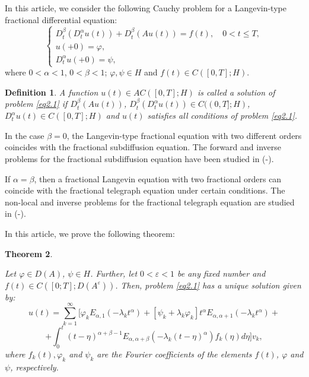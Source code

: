 \documentclass{amsart}
\numberwithin{equation}{section}
\newtheorem{thm}{Theorem}[section]
\newtheorem{defin}[thm]{Definition}
\begin{document}
In this article, we consider the following Cauchy problem for a  Langevin-type  fractional differential equation:
\begin{equation}\label{eq2.1}
 \begin{cases}
    D_{t}^{\beta}(D_t^{\alpha} u(t)) +D_t^{\beta} (A u(t))=f(t), \quad 0<t \leq T,
\\
    u(+0)=\varphi,
\\
D_t^{\alpha} u(+0)=\psi,
\end{cases}
\end{equation}where $0<\alpha<1$, $0<\beta<1$; $\varphi,\psi \in H$ and   $f(t) \in C([0,T];H)$.









\begin{defin}\label{defsol} A function  $u(t)\in AC([0,T];H)$  is called a solution of problem  \eqref{eq2.1} if $D_t^\beta (A u(t))$, $D_t^\beta(D_t^\alpha u(t)) \in C((0,T];H)$, $D_t^\alpha u(t) \in C([0,T];H)$ and $u(t)$ satisfies all conditions of problem \eqref{eq2.1}.
\end{defin}


In the case $\beta=0$, the Langevin-type fractional equation with two different orders coincides with the fractional subdiffusion equation. The forward and inverse problems for the fractional subdiffusion equation have been studied in (\cite{AlimovAshurov}-\cite{AshurovFayziev2}).

If $\alpha=\beta$, then a fractional Langevin equation with two fractional orders can coincide with the fractional telegraph equation under certain conditions. The non-local and inverse problems for the fractional telegraph equation are studied in (\cite{AshurovSaparbayev1}-\cite{AshurovSaparbayev3}).

In this article, we prove the following theorem:

\begin{thm} \label{theorem1}

Let $\varphi \in D(A)$, $\psi \in H$. Further, let $ 0<\varepsilon<1$ be any fixed number and   $f(t) \in C([0;T];D(A^\varepsilon))$. Then, problem \eqref{eq2.1} has a unique solution given by:
$$
    u(t)=\sum_{k=1}^\infty \bigg[\varphi_k E_{\alpha,1}(-\lambda_k t^\alpha)+[\psi_k+\lambda_k \varphi_k]t^\alpha E_{\alpha,\alpha+1}(-\lambda_k t^\alpha)+
$$
\begin{equation}\label{sol1}
    + \int_0^t (t-\eta)^{\alpha+\beta-1} E_{\alpha,\alpha+\beta}(-\lambda_k (t-\eta)^\alpha)f_k(\eta)  d\eta \bigg] v_k,
\end{equation}
where  $f_k(t),\varphi_k$ and $\psi_k$ are the Fourier coefficients of the elements  $f(t)$,  $\varphi$ and $\psi$, respectively.
\end{thm}
\end{document}
